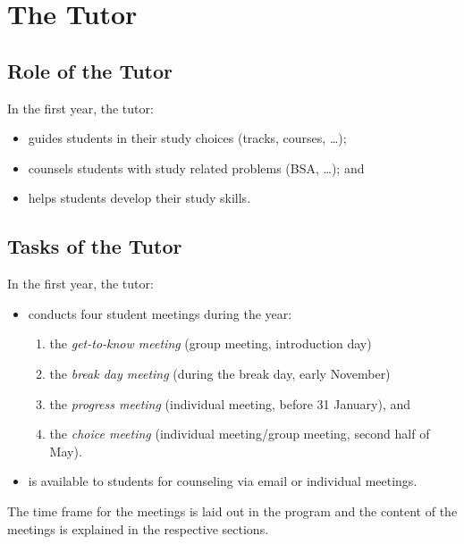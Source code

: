 \chapter{The Tutor}

\section{Role of the Tutor}

In the first year, the tutor:

	\begin{itemize}

		\item guides students in their study choices (tracks, courses, \dots);

		\item counsels students with study related problems (BSA, \dots); and

		\item helps students develop their study skills.

	\end{itemize}

\section{Tasks of the Tutor}

In the first year, the tutor:

	\begin{itemize}

		\item conducts four student meetings during the year:

			\begin{enumerate}

				\item the \emph{get-to-know meeting} (group meeting, introduction day)

				\item the \emph{break day meeting} (during the break day, early November)

				\item the \emph{progress meeting} (individual meeting, before 31 January), and

				\item the \emph{choice meeting} (individual meeting/group meeting, second half of May).

			\end{enumerate}

		\item is available to students for counseling via email or individual meetings.

	\end{itemize}

	The time frame for the meetings is laid out in the program and the content of the meetings is explained in the respective sections.

